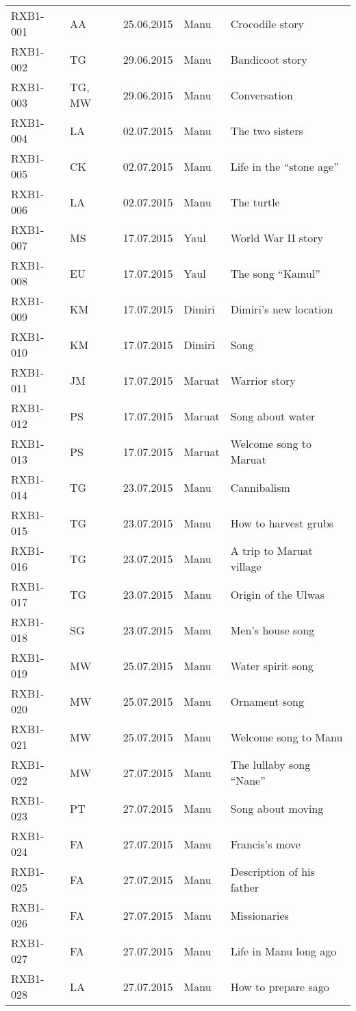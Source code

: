 \begin{xltabular}{\textwidth}{llllQ}
RXB1-001 & AA & 25.06.2015 & Manu & Crocodile story\\
RXB1-002 & TG & 29.06.2015 & Manu & Bandicoot story\\
RXB1-003 & TG, MW & 29.06.2015 & Manu & Conversation\\
RXB1-004 & LA & 02.07.2015 & Manu & The two sisters\\
RXB1-005 & CK & 02.07.2015 & Manu & Life in the “stone age”\\
RXB1-006 & LA & 02.07.2015 & Manu & The turtle\\
RXB1-007 & MS & 17.07.2015 & Yaul & World War II story\\
RXB1-008 & EU & 17.07.2015 & Yaul & The song “Kamul”\\
RXB1-009 & KM & 17.07.2015 & Dimiri & Dimiri’s new location\\
RXB1-010 & KM & 17.07.2015 & Dimiri & Song\\
RXB1-011 & JM & 17.07.2015 & Maruat & Warrior story\\
RXB1-012 & PS & 17.07.2015 & Maruat & Song about water\\
RXB1-013 & PS & 17.07.2015 & Maruat & Welcome song to Maruat\\
RXB1-014 & TG & 23.07.2015 & Manu & Cannibalism\\
RXB1-015 & TG & 23.07.2015 & Manu & How to harvest grubs\\
RXB1-016 & TG & 23.07.2015 & Manu & A trip to Maruat village\\
RXB1-017 & TG & 23.07.2015 & Manu & Origin of the Ulwas\\
RXB1-018 & SG & 23.07.2015 & Manu & Men’s house song\\
RXB1-019 & MW & 25.07.2015 & Manu & Water spirit song\\
RXB1-020 & MW & 25.07.2015 & Manu & Ornament song\\
RXB1-021 & MW & 25.07.2015 & Manu & Welcome song to Manu\\
RXB1-022 & MW & 27.07.2015 & Manu & The lullaby song “Nane”\\
RXB1-023 & PT & 27.07.2015 & Manu & Song about moving\\
RXB1-024 & FA & 27.07.2015 & Manu & Francis’s move\\
RXB1-025 & FA & 27.07.2015 & Manu & Description of his father\\
RXB1-026 & FA & 27.07.2015 & Manu & Missionaries\\
RXB1-027 & FA & 27.07.2015 & Manu & Life in Manu long ago\\
RXB1-028 & LA & 27.07.2015 & Manu & How to prepare sago\\

\end{xltabular}
